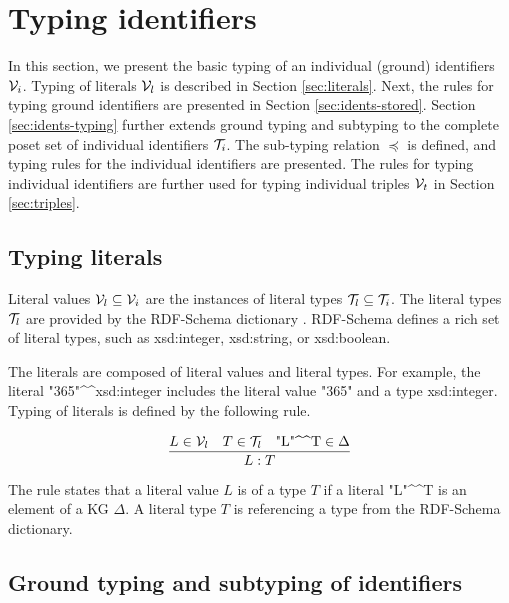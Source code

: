 \documentclass[runningheads]{llncs}
\newcommand{\V}{{\cal V}}
\newcommand{\T}{{\cal T}}
\begin{document}
\section{Typing identifiers}

In this section, we present the basic typing of an individual (ground)
identifiers $\V_i$. Typing of literals $\V_l$ is described in Section
\ref{sec:literals}. Next, the rules for typing ground identifiers are
presented in Section \ref{sec:idents-stored}. Section
\ref{sec:idents-typing} further extends ground typing and subtyping to
the complete poset set of individual identifiers $\T_i$. The
sub-typing relation $\preceq$ is defined, and typing rules for the
individual identifiers are presented. The rules for typing individual
identifiers are further used for typing individual triples $\V_t$ in
Section \ref{sec:triples}.





\subsection{Typing literals\label{sec:literals}}

Literal values $\V_l\subseteq\V_i$ are the instances of literal types
$\T_l\subseteq\T_i$. The literal types $\T_l$ are provided by the
RDF-Schema dictionary \cite{rdfschema}. RDF-Schema defines a rich set
of literal types, such as xsd:integer, xsd:string, or xsd:boolean.

The literals are composed of literal values and literal types. For
example, the literal
"365"\textasciicircum\textasciicircum\/xsd:integer includes the
literal value "365" and a type xsd:integer. Typing of literals is
defined by the following rule.

\begin{equation}
\dfrac{L\in\V_l\quad T\in\T_l\quad \text{"L"\textasciicircum\textasciicircum\/T}\in\Delta}
      {L:T}  
\end{equation}

The rule states that a literal value $L$ is of a type $T$ if a literal
"L"\textasciicircum\textasciicircum\/T is an element of a KG
$\Delta$. A literal type $T$ is referencing a type from the RDF-Schema
dictionary.






\subsection{Ground typing and subtyping of identifiers\label{sec:idents-stored}}
\end{document}
